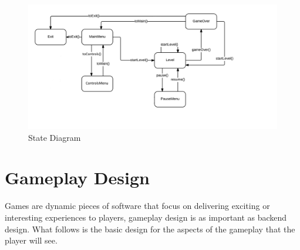 \documentclass[12pt]{article}       %
\begin{document}
\begin{figure} [H]
\centering
\includegraphics[width=7in]{PewPewStateDiagramFinal.png}
\caption{State Diagram} \label{StateDia}
\end{figure}

\section{Gameplay Design}
\label{sec:GPdesign}

Games are dynamic pieces of software that focus on delivering exciting or interesting experiences to players, gameplay design is as important as backend design. What follows is the basic design for the aspects of the gameplay that the player will see.
\end{document}
